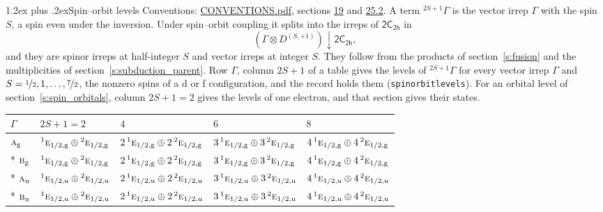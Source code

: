 \documentclass[10pt,a4paper]{article}
\makeatletter
\renewcommand\section{\@startsection{section}{1}{\z@}{-3ex plus -1ex minus -.2ex}%
  {1.2ex plus .2ex}{\normalfont\large\sffamily\bfseries\color{parttitle}}}
\numberwithin{equation}{section}
\newcommand{\grp}[1]{\mathsf{#1}}
\newcommand{\irr}[1]{\text{\normalfont\scshape #1}}
\newcommand{\conjpair}[1]{{}^{#1}}
\newcommand{\ptag}[1]{\mathrm{#1}}
\newcommand{\restr}[2]{#1\!\downarrow#2}
\newcommand{\irrJp}[2]{D^{(#1,#2)}}
\newcommand{\irrprod}{\otimes}
\newcommand{\term}[2]{{}^{#1}#2}
\makeatother
\begin{document}
\section{Spin--orbit levels}\label{s:spin_orbit}
Conventions: \href{../../CONVENTIONS.pdf}{CONVENTIONS.pdf}, sections \href{../../../rotation/CONVENTIONS.pdf\#conv.19}{19} and \href{../../CONVENTIONS.pdf\#conv.25.2}{25.2}.
\leavevmode\label{n:local.spin}\label{n:symbol.term}A term $\term{2S+1}{\Gamma}$ is the vector irrep $\Gamma$ with the spin $S$, a spin even under the inversion. Under spin--orbit coupling it splits into the irreps of $\grp{2C_{2h}}$ in
\begin{equation}\label{e:spinorbit}\restr{(\Gamma \irrprod \irrJp{S}{+1})}{\grp{2C_{2h}}},\end{equation}
and they are spinor irreps at half-integer $S$ and vector irreps at integer $S$. They follow from the products of section~\ref{s:fusion} and the multiplicities of section~\ref{s:subduction_parent}. Row $\Gamma$, column $2S + 1$ of a table gives the levels of $\term{2S+1}{\Gamma}$ for every vector irrep $\Gamma$ and $S = \nicefrac{1}{2}, 1, \dots, \nicefrac{7}{2}$, the nonzero spins of a d or f configuration, and the record holds them (\texttt{spinorbitlevels}). For an orbital level of section~\ref{s:spin_orbitals}, column $2S + 1 = 2$ gives the levels of one electron, and that section gives their states.
{\small\setlength{\tabcolsep}{3pt}\begin{longtable}{@{}lllll@{}}\toprule
$\Gamma$ & $2S + 1 = 2$ & $4$ & $6$ & $8$\\\midrule\endhead
\bottomrule\endfoot\endlastfoot
$\irr{a}_{\ptag{g}}$ & $\conjpair{1}\irr{e}_{1/2,\ptag{g}}\oplus \conjpair{2}\irr{e}_{1/2,\ptag{g}}$ & $2\,\conjpair{1}\irr{e}_{1/2,\ptag{g}}\oplus 2\,\conjpair{2}\irr{e}_{1/2,\ptag{g}}$ & $3\,\conjpair{1}\irr{e}_{1/2,\ptag{g}}\oplus 3\,\conjpair{2}\irr{e}_{1/2,\ptag{g}}$ & $4\,\conjpair{1}\irr{e}_{1/2,\ptag{g}}\oplus 4\,\conjpair{2}\irr{e}_{1/2,\ptag{g}}$\\*
$\irr{b}_{\ptag{g}}$ & $\conjpair{1}\irr{e}_{1/2,\ptag{g}}\oplus \conjpair{2}\irr{e}_{1/2,\ptag{g}}$ & $2\,\conjpair{1}\irr{e}_{1/2,\ptag{g}}\oplus 2\,\conjpair{2}\irr{e}_{1/2,\ptag{g}}$ & $3\,\conjpair{1}\irr{e}_{1/2,\ptag{g}}\oplus 3\,\conjpair{2}\irr{e}_{1/2,\ptag{g}}$ & $4\,\conjpair{1}\irr{e}_{1/2,\ptag{g}}\oplus 4\,\conjpair{2}\irr{e}_{1/2,\ptag{g}}$\\*
$\irr{a}_{\ptag{u}}$ & $\conjpair{1}\irr{e}_{1/2,\ptag{u}}\oplus \conjpair{2}\irr{e}_{1/2,\ptag{u}}$ & $2\,\conjpair{1}\irr{e}_{1/2,\ptag{u}}\oplus 2\,\conjpair{2}\irr{e}_{1/2,\ptag{u}}$ & $3\,\conjpair{1}\irr{e}_{1/2,\ptag{u}}\oplus 3\,\conjpair{2}\irr{e}_{1/2,\ptag{u}}$ & $4\,\conjpair{1}\irr{e}_{1/2,\ptag{u}}\oplus 4\,\conjpair{2}\irr{e}_{1/2,\ptag{u}}$\\*
$\irr{b}_{\ptag{u}}$ & $\conjpair{1}\irr{e}_{1/2,\ptag{u}}\oplus \conjpair{2}\irr{e}_{1/2,\ptag{u}}$ & $2\,\conjpair{1}\irr{e}_{1/2,\ptag{u}}\oplus 2\,\conjpair{2}\irr{e}_{1/2,\ptag{u}}$ & $3\,\conjpair{1}\irr{e}_{1/2,\ptag{u}}\oplus 3\,\conjpair{2}\irr{e}_{1/2,\ptag{u}}$ & $4\,\conjpair{1}\irr{e}_{1/2,\ptag{u}}\oplus 4\,\conjpair{2}\irr{e}_{1/2,\ptag{u}}$\\
\bottomrule\end{longtable}}
\end{document}

